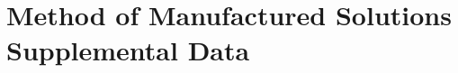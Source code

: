 \documentclass[../doc.tex]{subfiles}
\begin{document}
\chapter{Method of Manufactured Solutions Supplemental Data}
\begin{table}
\centering
\caption{}
\label{}
\begin{adjustbox}{max width=\textwidth}

\end{adjustbox}
\end{table}
\begin{table}
\centering
\caption{}
\label{}
\begin{adjustbox}{max width=\textwidth}

\end{adjustbox}
\end{table}
\begin{table}
\centering
\caption{}
\label{}
\begin{adjustbox}{max width=\textwidth}

\end{adjustbox}
\end{table}

\begin{table}
\centering
\caption{}
\label{}
\begin{adjustbox}{max width=\textwidth}

\end{adjustbox}
\end{table}
\begin{table}
\centering
\caption{}
\label{}
\begin{adjustbox}{max width=\textwidth}

\end{adjustbox}
\end{table}
\begin{table}
\centering
\caption{}
\label{}
\begin{adjustbox}{max width=\textwidth}

\end{adjustbox}
\end{table}
\end{document}
